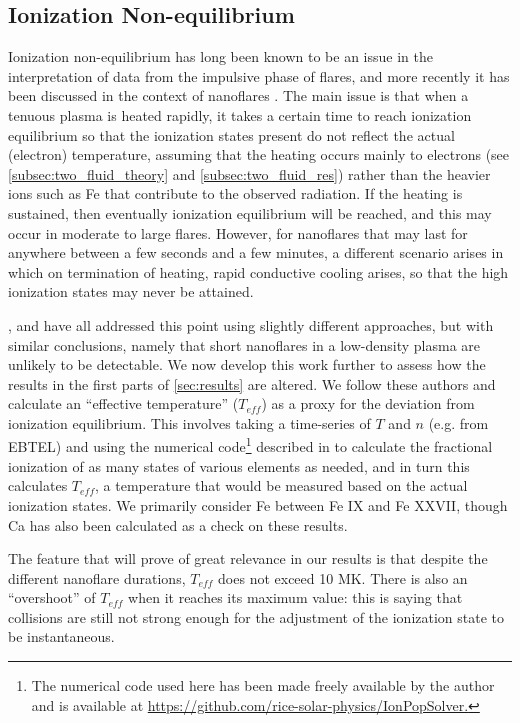 \documentclass[iop]{emulateapj}
\begin{document}
	\subsection{Ionization Non-equilibrium}
	\label{subsec:nei_theory}
	\par Ionization non-equilibrium has long been known to be an issue in the interpretation of data from the impulsive phase of flares, and more recently it has been discussed in the context of nanoflares \citep{bradshaw_explosive_2006,reale_nonequilibrium_2008}. The main issue is that when a tenuous plasma is heated rapidly, it takes a certain time to reach ionization equilibrium so that the ionization states present do not reflect the actual (electron) temperature, assuming that the heating occurs mainly to electrons (see \autoref{subsec:two_fluid_theory} and \autoref{subsec:two_fluid_res}) rather than the heavier ions such as Fe that contribute to the observed radiation. If the heating is sustained, then eventually ionization equilibrium will be reached, and this may occur in moderate to large flares. However, for nanoflares that may last for anywhere between a few seconds and a few minutes, a different scenario arises in which on termination of heating, rapid conductive cooling arises, so that the high ionization states may never be attained.
	\par \citet{bradshaw_explosive_2006}, \citet{reale_nonequilibrium_2008} and \citet{bradshaw_numerical_2009} have all addressed this point using slightly different approaches, but with similar conclusions, namely that short nanoflares in a low-density plasma are unlikely to be detectable. We now develop this work further to assess how the results in the first parts of \autoref{sec:results} are altered. We follow these authors and calculate an ``effective temperature'' ($T_{eff}$) as a proxy for the deviation from ionization equilibrium. This involves taking a time-series of $T$ and $n$ (e.g. from EBTEL) and using the numerical code\footnote{The numerical code used here has been made freely available by the author and is available at \url{https://github.com/rice-solar-physics/IonPopSolver.}} described in \citet{bradshaw_numerical_2009} to calculate the fractional ionization of as many states of various elements as needed, and in turn this calculates $T_{eff}$, a temperature that would be measured based on the actual ionization states. We primarily consider Fe between Fe IX and Fe XXVII, though Ca has also been calculated as a check on these results.
	\par The feature that will prove of great relevance in our results is that despite the different nanoflare durations, $T_{eff}$ does not exceed 10 MK. There is also an ``overshoot'' of $T_{eff}$ when it reaches its maximum value: this is saying that collisions are still not strong enough for the adjustment of the ionization state to be instantaneous.
\end{document}
